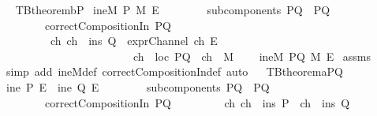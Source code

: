 \begin{isabellebody}
\endisatagproof
{\isafoldproof}%
%
\isadelimproof
\ \isanewline
%
\endisadelimproof
\isanewline
{}\isamarkupfalse%
\ TBtheorem{}b{\isacharunderscore}P{\isacharcolon}\isanewline
{}\ {\isachardoublequoteopen}ineM\ P\ M\ E{\isachardoublequoteclose}\isanewline
\ \ \ \ \ \ \ \ {\isachardoublequoteopen}subcomponents\ PQ\ {\isacharequal}\ {\isacharbraceleft}P{\isacharcomma}Q{\isacharbraceright}{\isachardoublequoteclose}\isanewline
\ \ \ \ \ \ \ \ {\isachardoublequoteopen}correctCompositionIn\ PQ{\isachardoublequoteclose}\isanewline
\ \ \ \ \ \ \ \ {\isachardoublequoteopen}{\isasymexists}\ ch{\isachardot}\ {\isacharparenleft}{\isacharparenleft}ch\ {\isasymin}\ {\isacharparenleft}ins\ Q{\isacharparenright}{\isacharparenright}\ {\isasymand}\ {\isacharparenleft}exprChannel\ ch\ E{\isacharparenright}\ {\isasymand}\ \isanewline
\ \ \ \ \ \ \ \ \ \ \ \ \ \ \ \ \ \ \ \ \ \ \ \ {\isacharparenleft}ch\ {\isasymnotin}\ {\isacharparenleft}loc\ PQ{\isacharparenright}{\isacharparenright}\ {\isasymand}\ {\isacharparenleft}ch\ {\isasymin}\ M{\isacharparenright}{\isacharparenright}{\isachardoublequoteclose}\isanewline
{}\ \ \ \ {\isachardoublequoteopen}ineM\ PQ\ M\ E{\isachardoublequoteclose}\isanewline
%
\isadelimproof
%
\endisadelimproof
%
\isatagproof
{}\isamarkupfalse%
\ assms\ \isamarkupfalse%
\ {\isacharparenleft}simp\ add{\isacharcolon}\ ineM{\isacharunderscore}def\ correctCompositionIn{\isacharunderscore}def{\isacharcomma}\ auto{\isacharparenright}%
\endisatagproof
{\isafoldproof}%
%
\isadelimproof
\ \isanewline
%
\endisadelimproof
\isanewline
{}\isamarkupfalse%
\ TBtheorem{}a{\isacharunderscore}PQ{\isacharcolon}\isanewline
{}\ {\isachardoublequoteopen}{\isacharparenleft}ine\ P\ E{\isacharparenright}\ {\isasymor}\ {\isacharparenleft}ine\ Q\ E{\isacharparenright}{\isachardoublequoteclose}\isanewline
\ \ \ \ \ \ \ \ {\isachardoublequoteopen}subcomponents\ PQ\ {\isacharequal}\ {\isacharbraceleft}P{\isacharcomma}Q{\isacharbraceright}{\isachardoublequoteclose}\isanewline
\ \ \ \ \ \ \ \ {\isachardoublequoteopen}correctCompositionIn\ PQ{\isachardoublequoteclose}\isanewline
\ \ \ \ \ \ \ \ {\isachardoublequoteopen}{\isasymexists}\ ch{\isachardot}\ {\isacharparenleft}{\isacharparenleft}{\isacharparenleft}ch\ {\isasymin}\ {\isacharparenleft}ins\ P{\isacharparenright}{\isacharparenright}\ {\isasymor}\ {\isacharparenleft}ch\ {\isasymin}\ {\isacharparenleft}ins\ Q{\isacharparenright}\ {\isacharparenright}{\isacharparenright}\ {\isasymand}\ \isanewline

\end{isabellebody}
